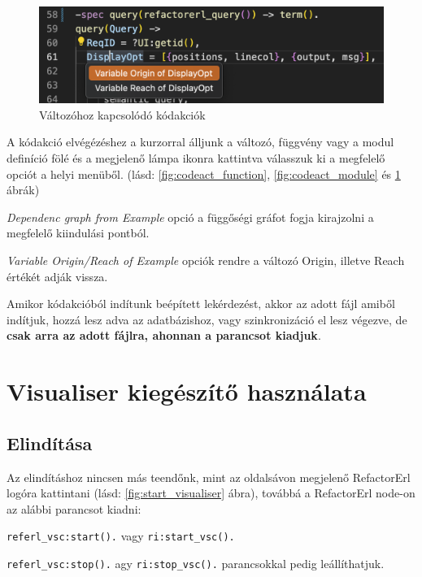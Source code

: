 \begin{figure}[H]
  \centering
  \includegraphics[width=0.7\linewidth]{images/codeact_variable.png}
  \caption{Változóhoz kapcsolódó kódakciók}
  \label{fig:codeact_variable}
\end{figure}

A kódakció elvégézéshez a kurzorral álljunk a változó, függvény vagy a modul definíció fölé és a megjelenő lámpa ikonra kattintva válasszuk ki a megfelelő opciót a helyi menüből. (lásd: \ref{fig:codeact_function}, \ref{fig:codeact_module} és \ref{fig:codeact_variable} ábrák)

\noindent \textit{Dependenc graph from Example} opció a függőségi gráfot fogja kirajzolni a megfelelő kiindulási pontból.

\noindent \textit{Variable Origin/Reach of Example} opciók rendre a változó Origin, illetve Reach értékét adják vissza.

Amikor kódakcióból indítunk beépített lekérdezést, akkor az adott fájl amiből indítjuk, hozzá lesz adva az adatbázishoz, vagy szinkronizáció el lesz végezve, de \textbf{csak arra az adott fájlra, ahonnan a parancsot kiadjuk}.

\section{Visualiser kiegészítő használata}
\subsection{Elindítása}

Az elindításhoz nincsen más teendőnk, mint az oldalsávon megjelenő RefactorErl logóra kattintani (lásd: \ref{fig:start_visualiser} ábra), továbbá a RefactorErl node-on az alábbi parancsot kiadni:

\noindent \lstinline{referl_vsc:start().} vagy \lstinline{ri:start_vsc().}

\noindent \lstinline{referl_vsc:stop().} agy \lstinline{ri:stop_vsc().} parancsokkal pedig leállíthatjuk.


